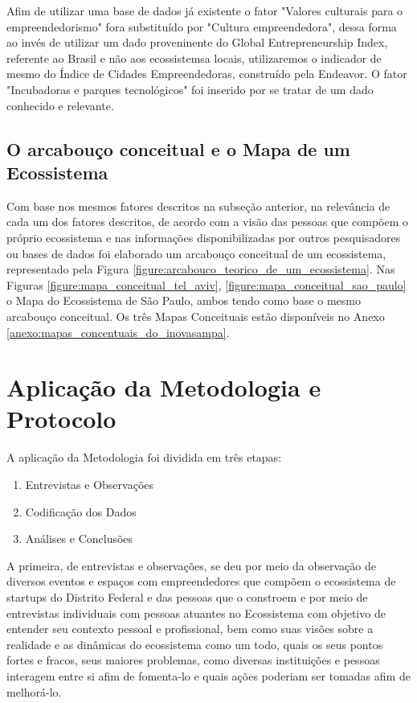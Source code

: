 Afim de utilizar uma base de dados já existente o fator "Valores culturais para o empreendedorismo" fora substituído por "Cultura empreendedora", dessa forma ao invés de utilizar um dado proveninente do Global Entrepreneurship Index, referente ao Brasil e não aos ecossistemsa locais, utilizaremos o indicador de mesmo do Índice de Cidades Empreendedoras, construído pela Endeavor. O fator "Incubadoras e parques tecnológicos" foi inserido por se tratar de um dado conhecido e relevante. 

\subsection{O arcabouço conceitual e o Mapa de um Ecossistema}
\label{subsection:arcabouco_conceitual_e_modelo}

Com base nos mesmos fatores descritos na subseção anterior, na relevância de cada um dos fatores descritos, de acordo com a visão das pessoas que compõem o próprio ecossistema e nas informações disponibilizadas por outros pesquisadores ou bases de dados foi elaborado um arcabouço conceitual de um ecossistema, representado pela Figura \ref{figure:arcabouco_teorico_de_um_ecossistema}. Nas Figuras \ref{figure:mapa_conceitual_tel_aviv}, \ref{figure:mapa_conceitual_sao_paulo} o Mapa do Ecossistema de São Paulo, ambos tendo como base o mesmo arcabouço conceitual. Os três Mapas Conceituais estão disponíveis no Anexo \ref{anexo:mapas_concentuais_do_inovasampa}.

\section{Aplicação da Metodologia e Protocolo}
\label{section:aplicacao_da_metodologia}

A aplicação da Metodologia foi dividida em três etapas:

\begin{enumerate}
  \item Entrevistas e Observações
  \item Codificação dos Dados
  \item Análises e Conclusões
\end{enumerate}

A primeira, de entrevistas e observações, se deu por meio da observação de diversos eventos e espaços com empreendedores que compõem o ecossistema de startups do Distrito Federal e das pessoas que o constroem e por meio de entrevistas individuais com pessoas atuantes no Ecossistema com objetivo de entender seu contexto pessoal e profissional, bem como suas visões sobre a realidade e as dinâmicas do ecossistema como um todo, quais os seus pontos fortes e fracos, seus maiores problemas, como diversas instituições e pessoas interagem entre si afim de fomenta-lo e quais ações poderiam ser tomadas afim de melhorá-lo.

